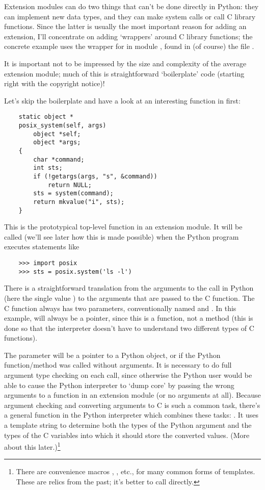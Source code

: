Extension modules can do two things that can't be done directly in
Python: they can implement new data types, and they can make system
calls or call C library functions.  Since the latter is usually the
most important reason for adding an extension, I'll concentrate on
adding `wrappers' around C library functions; the concrete example
uses the wrapper for
 in module , found in (of course) the file
.

It is important not to be impressed by the size and complexity of
the average extension module; much of this is straightforward
`boilerplate' code (starting right with the copyright notice)!

Let's skip the boilerplate and have a look at an interesting function
in  first:

\begin{verbatim}
    static object *
    posix_system(self, args)
        object *self;
        object *args;
    {
        char *command;
        int sts;
        if (!getargs(args, "s", &command))
            return NULL;
        sts = system(command);
        return mkvalue("i", sts);
    }
\end{verbatim}

This is the prototypical top-level function in an extension module.
It will be called (we'll see later how this is made possible) when the
Python program executes statements like

\begin{verbatim}
    >>> import posix
    >>> sts = posix.system('ls -l')
\end{verbatim}

There is a straightforward translation from the arguments to the call
in Python (here the single value ) to the arguments that
are passed to the C function.  The C function always has two
parameters, conventionally named  and .  In this
example,  will always be a  pointer, since this is a
function, not a method (this is done so that the interpreter doesn't
have to understand two different types of C functions).

The  parameter will be a pointer to a Python object, or
 if the Python function/method was called without
arguments.  It is necessary to do full argument type checking on each
call, since otherwise the Python user would be able to cause the
Python interpreter to `dump core' by passing the wrong arguments to a
function in an extension module (or no arguments at all).  Because
argument checking and converting arguments to C is such a common task,
there's a general function in the Python interpreter which combines
these tasks: .  It uses a template string to determine
both the types of the Python argument and the types of the C variables
into which it should store the converted values.  (More about this
later.)\footnote{
There are convenience macros ,
, etc., for many common forms of 
templates.  These are relics from the past; it's better to call
 directly.}

